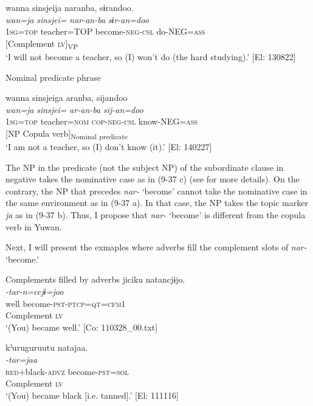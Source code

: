 \ex \label{ex:9.37b} %
    \gllll  wanna  sinsjeija  naranba,  sɨrandoo.\\
       \textit{wan=ja}  \textit{sinsjei=}  \textit{nar-an-ba}  \textit{sɨr-an=doo}\\
       1\textsc{sg}=\textsc{top}  teacher=TOP  become-\textsc{neg}-\textsc{csl}  do-NEG=\textsc{ass}\\
      {}  {[Complement}  {\textsc{lv}]\textsubscript{VP}}  \\
      \glt        ‘I will not become a teacher, so (I) won’t do (the hard studying).’ [El: 130822]

\exi{}  Nominal predicate phrase

\ex \label{ex:9.37c} %
    \gllll  wanna  sinsjeiga  aranba,  sijandoo\\
       \textit{wan=ja}  \textit{sinsjei=}  \textit{ar-an-ba}  \textit{sij-an=doo}\\
       1\textsc{sg}=\textsc{top}  teacher=\textsc{nom}  \textsc{cop}-\textsc{neg}-\textsc{csl}  know-NEG=\textsc{ass}\\
       {} {[NP}  {Copula verb]\textsubscript{Nominal predicate}} \\
      \glt        ‘I am not a teacher, so (I) don’t know (it).’ [El: 140227]
    \z
\z

The NP in the predicate (not the subject NP) of the subordinate clause in negative takes the nominative case as in (9-37 c) (see  for more details). On the contrary, the NP that precedes \textit{nar-} ‘become’ cannot take the nominative case in the same environment as in (9-37 a). In that case, the NP takes the topic marker \textit{ja} as in (9-37 b). Thus, I propose that \textit{nar-} ‘become’ is different from the copula verb in Yuwan.

  Next, I will present the exmaples where adverbs fill the complement slots of \textit{nar-} ‘become.’

\ea   Complements filled by adverbs \label{ex:9.38}
\ea \label{ex:9.38a}%
 \gllll  jiciku  natancjɨjo.\\
      \textit{}  \textit{-tar-n=ccjɨ=joo}\\
      well  become-\textsc{pst}-\textsc{ptcp}=\textsc{qt}=\textsc{cfm}1\\
      Complement  \textsc{lv}\\
      \glt       ‘(You) became well.’ [Co: 110328\_00.txt]

\ex \label{ex:9.38b} %
    \gllll  kˀuruguruutu  natajaa.  \\
      \textit{}  \textit{-tar=jaa} \\
      \textsc{red}+black-\textsc{advz}  become-\textsc{pst}=\textsc{sol}  \\
      Complement  \textsc{lv}  \\
      \glt       ‘(You) became black [i.e. tanned].’ [El: 111116]
    \z
\z

